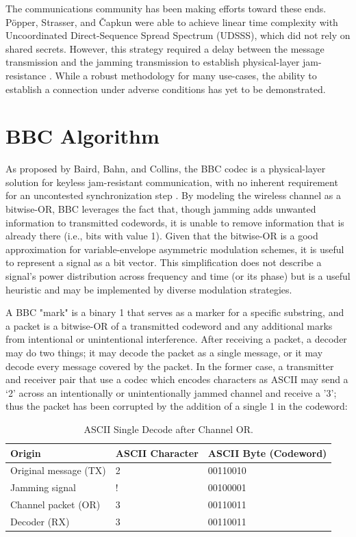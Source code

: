 \documentclass[conference]{IEEEtran}
\begin{document}
The communications community has been making efforts toward these ends. Pöpper, Strasser, and Čapkun were able to achieve linear time complexity with Uncoordinated Direct-Sequence Spread Spectrum (UDSSS), which did not rely on shared secrets. However, this strategy required a delay between the message transmission and the jamming transmission to establish physical-layer jam-resistance \cite{udsss}. While a robust methodology for many use-cases, the ability to establish a connection under adverse conditions has yet to be demonstrated.


\section{BBC Algorithm}
As proposed by Baird, Bahn, and Collins, the BBC codec is a physical-layer solution for keyless jam-resistant communication, with no inherent requirement for an uncontested synchronization step \cite{ogBBC}. By modeling the wireless channel as a bitwise-OR, BBC leverages the fact that, though jamming adds unwanted information to transmitted codewords, it is unable to remove information that is already there (i.e., bits with value 1). Given that the bitwise-OR is a good approximation for variable-envelope asymmetric modulation schemes, it is useful to represent a signal as a bit vector. This simplification does not describe a signal’s power distribution across frequency and time (or its phase) but is a useful heuristic and may be implemented by diverse modulation strategies.     

A BBC "mark" is a binary 1 that serves as a marker for a specific substring, and a packet is a bitwise-OR of a transmitted codeword and any additional marks from intentional or unintentional interference. After receiving a packet, a decoder may do two things; it may decode the packet as a single message, or it may decode every message covered by the packet. In the former case, a transmitter and receiver pair that use a codec which encodes characters as ASCII may send a ‘2’ across an intentionally or unintentionally jammed channel and receive a '3'; thus the packet has been corrupted by the addition of a single 1 in the codeword:  

\begin{table}[h]
    \centering
    \caption{ASCII Single Decode after Channel OR. }
    \begin{center}
    \begin{tabular}{ | m{9.5em} | m{1.4cm}| m{1.35cm} | } 
      \hline
      Origin & ASCII Character & ASCII Byte (Codeword) \\ 
      \hline
      Original message (TX) & 2 &  00110010\\ 
      \hline
      Jamming signal & ! &  00100001\\ 
      \hline
      Channel packet (OR) & 3 & 00110011 \\ 
      \hline
      Decoder (RX) & 3 & 00110011 \\ 
      \hline
    \end{tabular}
    \end{center}
\end{table}
\end{document}
